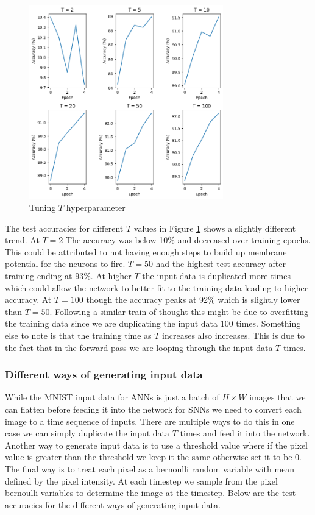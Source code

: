 \documentclass[12pt, letterpaper]{article}
\begin{document}
\begin{figure}[H]
    \centering
    \includegraphics[width=0.75\textwidth]{t_tuning.png}
    \caption{Tuning $T$ hyperparameter}
    \label{fig:v_tuning}
\end{figure}
The test accuracies for different $T$ values in Figure \ref{fig:v_tuning} shows a slightly different trend. At $T=2$ The accuracy was below 10\% and decreased over training epochs. This could be attributed to not having enough steps to build up membrane potential for the neurons to fire. $T = 50$ had the highest test accuracy after training ending at 93\%. At higher $T$ the input data is duplicated more times which could allow the network to better fit to the training data leading to higher accuracy. At $T = 100$ though the accuracy peaks at 92\% which is slightly lower than $T = 50$. Following a similar train of thought this might be due to overfitting the training data since we are duplicating the input data 100 times. Something else to note is that the training time as $T$ increases also increases. This is due to the fact that in the forward pass we are looping through the input data $T$ times.

\setcounter{subsubsection}{4}
\subsubsection{Different ways of generating input data}
While the MNIST input data for ANNs is just a batch of ${H \times W}$ images that we can flatten before feeding it into the network for SNNs we need to convert each image to a time sequence of inputs. There are multiple ways to do this in one case we can simply duplicate the input data $T$ times and feed it into the network. Another way to generate input data is to use a threshold value where if the pixel value is greater than the threshold we keep it the same otherwise set it to be 0. The final way is to treat each pixel as a bernoulli random variable with mean defined by the pixel intensity. At each timestep we sample from the pixel bernoulli variables to determine the image at the timestep. Below are the test accuracies for the different ways of generating input data.
\end{document}
